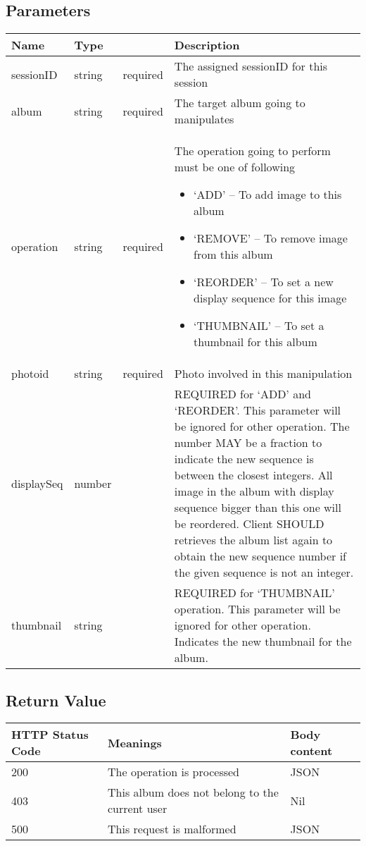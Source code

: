 \documentclass[a4paper,12pt]{report}
\begin{document}
	\subsection{Parameters}
	\begin{tabular}{|l|ll|p{10cm}|}
		\hline
		Name & Type & & Description\\\hline
		sessionID & string & required & The assigned sessionID for this session\\\hline
		album & string & required & The target album going to manipulates\\\hline
		operation & string & required & The operation going to perform\newline
		must be one of following\begin{itemize}
			\item `ADD' -- To add image to this album
			\item `REMOVE' -- To remove image from this album
			\item `REORDER' -- To set a new display sequence for this image
			\item `THUMBNAIL' -- To set a thumbnail for this album
		\end{itemize}\\\hline
		photoid & string & required & Photo involved in this manipulation\\\hline
		displaySeq & number & & REQUIRED for `ADD' and `REORDER'. This parameter will be ignored for other operation.\newline
		The number MAY be a fraction to indicate the new sequence is between the closest integers. All image in the album with display sequence bigger than this one will be reordered. \newline Client SHOULD retrieves the album list again to obtain the new sequence number if the given sequence is not an integer.\\\hline
		thumbnail & string & & REQUIRED for `THUMBNAIL' operation. This parameter will be ignored for other operation. \newline Indicates the new thumbnail for the album.\\\hline
	\end{tabular}
	\subsection{Return Value}
	\begin{tabular}{|l|p{10cm}|l|}
		\hline
		HTTP Status Code & Meanings & Body content  \\\hline
		200 & The operation is processed & JSON\\\hline
		403 & This album does not belong to the current user & Nil\\\hline
		500 & This request is malformed & JSON\\\hline
	\end{tabular}
\end{document}
